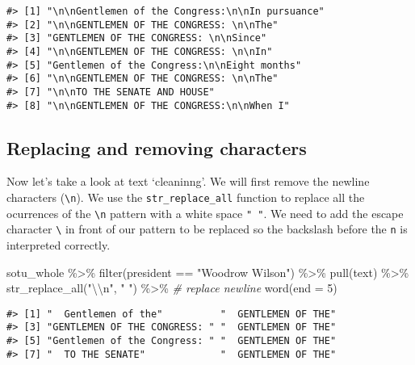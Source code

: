 \documentclass[
]{book}
\newenvironment{Shaded}{\begin{snugshade}}{\end{snugshade}}
\newcommand{\AttributeTok}[1]{\textcolor[rgb]{0.77,0.63,0.00}{#1}}
\newcommand{\CommentTok}[1]{\textcolor[rgb]{0.56,0.35,0.01}{\textit{#1}}}
\newcommand{\DecValTok}[1]{\textcolor[rgb]{0.00,0.00,0.81}{#1}}
\newcommand{\FunctionTok}[1]{\textcolor[rgb]{0.00,0.00,0.00}{#1}}
\newcommand{\NormalTok}[1]{#1}
\newcommand{\SpecialCharTok}[1]{\textcolor[rgb]{0.00,0.00,0.00}{#1}}
\newcommand{\StringTok}[1]{\textcolor[rgb]{0.31,0.60,0.02}{#1}}
\begin{document}
\begin{verbatim}
#> [1] "\n\nGentlemen of the Congress:\n\nIn pursuance"
#> [2] "\n\nGENTLEMEN OF THE CONGRESS: \n\nThe"        
#> [3] "GENTLEMEN OF THE CONGRESS: \n\nSince"          
#> [4] "\n\nGENTLEMEN OF THE CONGRESS: \n\nIn"         
#> [5] "Gentlemen of the Congress:\n\nEight months"    
#> [6] "\n\nGENTLEMEN OF THE CONGRESS: \n\nThe"        
#> [7] "\n\nTO THE SENATE AND HOUSE"                   
#> [8] "\n\nGENTLEMEN OF THE CONGRESS:\n\nWhen I"
\end{verbatim}

\hypertarget{replacing-and-removing-characters}{%
\subsection{Replacing and removing characters}\label{replacing-and-removing-characters}}

Now let's take a look at text `cleaninng'. We will first remove the newline characters (\texttt{\textbackslash{}n}). We use the \texttt{str\_replace\_all} function to replace all the ocurrences of the \texttt{\textbackslash{}n} pattern with a white space \texttt{"\ "}. We need to add the escape character \texttt{\textbackslash{}} in front of our pattern to be replaced so the backslash before the \texttt{n} is interpreted correctly.

\begin{Shaded}
\begin{Highlighting}[]
\NormalTok{sotu\_whole }\SpecialCharTok{\%\textgreater{}\%} 
  \FunctionTok{filter}\NormalTok{(president }\SpecialCharTok{==} \StringTok{"Woodrow Wilson"}\NormalTok{) }\SpecialCharTok{\%\textgreater{}\%}  
  \FunctionTok{pull}\NormalTok{(text) }\SpecialCharTok{\%\textgreater{}\%}
  \FunctionTok{str\_replace\_all}\NormalTok{(}\StringTok{"}\SpecialCharTok{\textbackslash{}\textbackslash{}}\StringTok{n"}\NormalTok{, }\StringTok{" "}\NormalTok{) }\SpecialCharTok{\%\textgreater{}\%} \CommentTok{\# replace newline}
  \FunctionTok{word}\NormalTok{(}\AttributeTok{end =} \DecValTok{5}\NormalTok{) }
\end{Highlighting}
\end{Shaded}

\begin{verbatim}
#> [1] "  Gentlemen of the"          "  GENTLEMEN OF THE"         
#> [3] "GENTLEMEN OF THE CONGRESS: " "  GENTLEMEN OF THE"         
#> [5] "Gentlemen of the Congress: " "  GENTLEMEN OF THE"         
#> [7] "  TO THE SENATE"             "  GENTLEMEN OF THE"
\end{verbatim}
\end{document}

